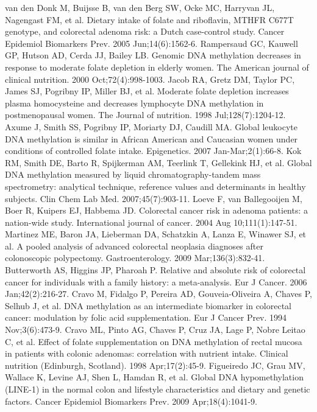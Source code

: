 \begin{thebibliography}{12}
		van den Donk M, Buijsse B, van den Berg SW, Ocke MC, Harryvan JL, Nagengast FM, et al. Dietary intake of folate and riboflavin, MTHFR C677T genotype, and colorectal adenoma risk: a Dutch case-control study. Cancer Epidemiol Biomarkers Prev. 2005 Jun;14(6):1562-6. 
		Rampersaud GC, Kauwell GP, Hutson AD, Cerda JJ, Bailey LB. Genomic DNA methylation decreases in response to moderate folate depletion in elderly women. The American journal of clinical nutrition. 2000 Oct;72(4):998-1003. 
		Jacob RA, Gretz DM, Taylor PC, James SJ, Pogribny IP, Miller BJ, et al. Moderate folate depletion increases plasma homocysteine and decreases lymphocyte DNA methylation in postmenopausal women. The Journal of nutrition. 1998 Jul;128(7):1204-12. 
		Axume J, Smith SS, Pogribny IP, Moriarty DJ, Caudill MA. Global leukocyte DNA methylation is similar in African American and Caucasian women under conditions of controlled folate intake. Epigenetics. 2007 Jan-Mar;2(1):66-8. 
		Kok RM, Smith DE, Barto R, Spijkerman AM, Teerlink T, Gellekink HJ, et al. Global DNA methylation measured by liquid chromatography-tandem mass spectrometry: analytical technique, reference values and determinants in healthy subjects. Clin Chem Lab Med. 2007;45(7):903-11. 
		Loeve F, van Ballegooijen M, Boer R, Kuipers EJ, Habbema JD. Colorectal cancer risk in adenoma patients: a nation-wide study. International journal of cancer. 2004 Aug 10;111(1):147-51. 
		Martinez ME, Baron JA, Lieberman DA, Schatzkin A, Lanza E, Winawer SJ, et al. A pooled analysis of advanced colorectal neoplasia diagnoses after colonoscopic polypectomy. Gastroenterology. 2009 Mar;136(3):832-41. 
		Butterworth AS, Higgins JP, Pharoah P. Relative and absolute risk of colorectal cancer for individuals with a family history: a meta-analysis. Eur J Cancer. 2006 Jan;42(2):216-27. 
		Cravo M, Fidalgo P, Pereira AD, Gouveia-Oliveira A, Chaves P, Selhub J, et al. DNA methylation as an intermediate biomarker in colorectal cancer: modulation by folic acid supplementation. Eur J Cancer Prev. 1994 Nov;3(6):473-9. 
		Cravo ML, Pinto AG, Chaves P, Cruz JA, Lage P, Nobre Leitao C, et al. Effect of folate supplementation on DNA methylation of rectal mucosa in patients with colonic adenomas: correlation with nutrient intake. Clinical nutrition (Edinburgh, Scotland). 1998 Apr;17(2):45-9. 
		Figueiredo JC, Grau MV, Wallace K, Levine AJ, Shen L, Hamdan R, et al. Global DNA hypomethylation (LINE-1) in the normal colon and lifestyle characteristics and dietary and genetic factors. Cancer Epidemiol Biomarkers Prev. 2009 Apr;18(4):1041-9. 

\end{thebibliography}
